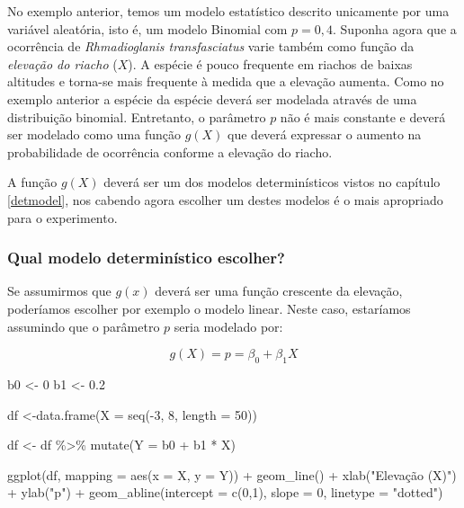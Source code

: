 \documentclass[
]{book}
\newenvironment{Shaded}{\begin{snugshade}}{\end{snugshade}}
\newcommand{\AttributeTok}[1]{\textcolor[rgb]{0.77,0.63,0.00}{#1}}
\newcommand{\DecValTok}[1]{\textcolor[rgb]{0.00,0.00,0.81}{#1}}
\newcommand{\FloatTok}[1]{\textcolor[rgb]{0.00,0.00,0.81}{#1}}
\newcommand{\FunctionTok}[1]{\textcolor[rgb]{0.00,0.00,0.00}{#1}}
\newcommand{\NormalTok}[1]{#1}
\newcommand{\OtherTok}[1]{\textcolor[rgb]{0.56,0.35,0.01}{#1}}
\newcommand{\SpecialCharTok}[1]{\textcolor[rgb]{0.00,0.00,0.00}{#1}}
\newcommand{\StringTok}[1]{\textcolor[rgb]{0.31,0.60,0.02}{#1}}
\begin{document}
No exemplo anterior, temos um modelo estatístico descrito unicamente por uma variável aleatória, isto é, um modelo Binomial com \(p = 0,4\). Suponha agora que a ocorrência de \emph{Rhmadioglanis transfasciatus} varie também como função da \emph{elevação do riacho} (\(X\)). A espécie é pouco frequente em riachos de baixas altitudes e torna-se mais frequente à medida que a elevação aumenta. Como no exemplo anterior a espécie da espécie deverá ser modelada através de uma distribuição binomial. Entretanto, o parâmetro \(p\) não é mais constante e deverá ser modelado como uma função \(g(X)\) que deverá expressar o aumento na probabilidade de ocorrência conforme a elevação do riacho.

A função \(g(X)\) deverá ser um dos modelos determinísticos vistos no capítulo \ref{detmodel}, nos cabendo agora escolher um destes modelos é o mais apropriado para o experimento.

\hypertarget{qual-modelo-determinuxedstico-escolher}{%
\subsubsection*{Qual modelo determinístico escolher?}\label{qual-modelo-determinuxedstico-escolher}}

Se assumirmos que \(g(x)\) deverá ser uma função crescente da elevação, poderíamos escolher por exemplo o modelo linear. Neste caso, estaríamos assumindo que o parâmetro \(p\) seria modelado por:

\[g(X) = p = \beta_0 + \beta_1 X\]

\begin{Shaded}
\begin{Highlighting}[]
\NormalTok{b0 }\OtherTok{\textless{}{-}} \DecValTok{0}
\NormalTok{b1 }\OtherTok{\textless{}{-}} \FloatTok{0.2}

\NormalTok{df }\OtherTok{\textless{}{-}}\FunctionTok{data.frame}\NormalTok{(}\AttributeTok{X =} \FunctionTok{seq}\NormalTok{(}\SpecialCharTok{{-}}\DecValTok{3}\NormalTok{, }\DecValTok{8}\NormalTok{, }\AttributeTok{length =} \DecValTok{50}\NormalTok{))}

\NormalTok{df }\OtherTok{\textless{}{-}}\NormalTok{ df }\SpecialCharTok{\%\textgreater{}\%} \FunctionTok{mutate}\NormalTok{(}\AttributeTok{Y =}\NormalTok{ b0 }\SpecialCharTok{+}\NormalTok{ b1 }\SpecialCharTok{*}\NormalTok{ X)}

\FunctionTok{ggplot}\NormalTok{(df, }\AttributeTok{mapping =} \FunctionTok{aes}\NormalTok{(}\AttributeTok{x =}\NormalTok{ X, }\AttributeTok{y =}\NormalTok{ Y)) }\SpecialCharTok{+}
  \FunctionTok{geom\_line}\NormalTok{() }\SpecialCharTok{+}
  \FunctionTok{xlab}\NormalTok{(}\StringTok{"Elevação (X)"}\NormalTok{) }\SpecialCharTok{+}
  \FunctionTok{ylab}\NormalTok{(}\StringTok{"p"}\NormalTok{) }\SpecialCharTok{+}
  \FunctionTok{geom\_abline}\NormalTok{(}\AttributeTok{intercept =} \FunctionTok{c}\NormalTok{(}\DecValTok{0}\NormalTok{,}\DecValTok{1}\NormalTok{), }\AttributeTok{slope =} \DecValTok{0}\NormalTok{, }\AttributeTok{linetype =} \StringTok{"dotted"}\NormalTok{)}
\end{Highlighting}
\end{Shaded}
\end{document}
